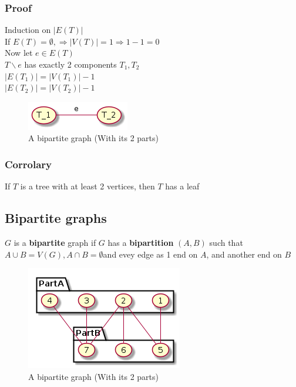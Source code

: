         \subsubsection{Proof}
            Induction on $|E(T)|$\\
            If $E(T)=\emptyset, \Rightarrow|V(T)|=1\Rightarrow 1-1=0$\\
            Now let $e\in E(T)$\\
            $T\backslash e$ has exactly 2 components $T_1, T_2$\\
            $|E(T_1)|=|V(T_1)|-1$\\
            $|E(T_2)|=|V(T_2)|-1$\\
            \begin{figure}[h]
                \centering
                \includegraphics[scale=0.5]{ressources/images/BipartiteGraph2.png}
                \caption{A bipartite graph (With its 2 parts)}
                \label{Bipartite graph}
            \end{figure}
        \subsubsection{Corrolary}
            If $T$ is a tree with at least 2 vertices, then $T$ has a leaf
    \subsection{Bipartite graphs}
        $G$ is a \textbf{bipartite} graph if $G$ has a \textbf{bipartition} $(A, B)$ such that $A\cup B=V(G), A\cap B=\emptyset$and evey edge as 1 end on $A$, and another end on $B$
        \begin{figure}[h]
            \centering
            \includegraphics[scale=0.5]{ressources/images/BipartiteGraph.png}
            \caption{A bipartite graph (With its 2 parts)}
            \label{Bipartite graph}
        \end{figure}
